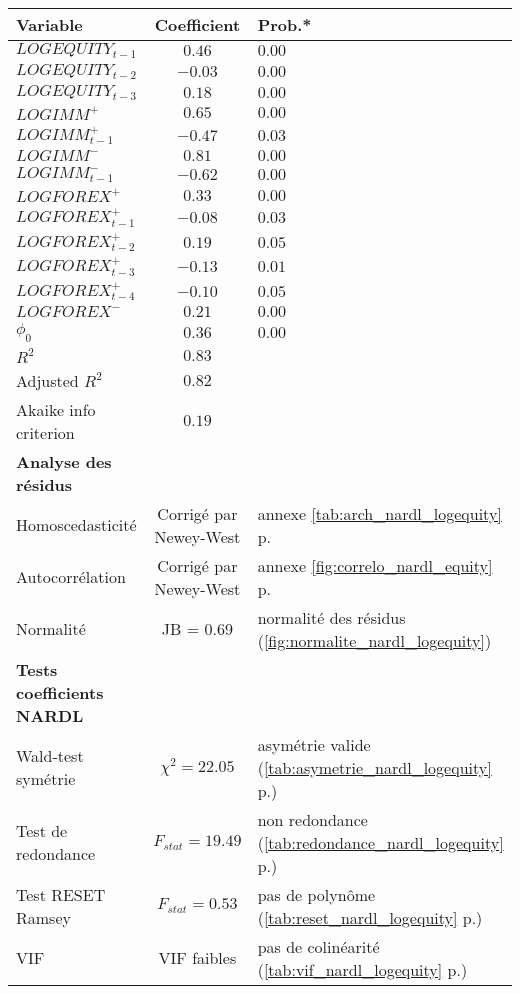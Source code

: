 \begin{tabular}{lcl}
\toprule
\textbf{Variable} & \textbf{Coefficient} & \textbf{Prob.*} \\ %
\midrule
$LOGEQUITY_{t-1}$ & $0.46$ & $0.00$ \\
$LOGEQUITY_{t-2}$ & $-0.03$ & $0.00$ \\
$LOGEQUITY_{t-3}$ & $0.18$ & $0.00$ \\
$LOGIMM^+$ & $0.65$ & $0.00$ \\
$LOGIMM^+_{t-1}$ & $-0.47$ & $0.03$ \\
$LOGIMM^-$ & $0.81$ & $0.00$ \\
$LOGIMM^-_{t-1}$ & $-0.62$ & $0.00$ \\
$LOGFOREX^+$ & $0.33$ & $0.00$ \\
$LOGFOREX^+_{t-1}$ & $-0.08$ & $0.03$ \\
$LOGFOREX^+_{t-2}$ & $0.19$ & $0.05$ \\
$LOGFOREX^+_{t-3}$ & $-0.13$ & $0.01$ \\
$LOGFOREX^+_{t-4}$ & $-0.10$ & $0.05$ \\
$LOGFOREX^-$ & $0.21$ & $0.00$ \\
$\phi_0$ & $0.36$ & $0.00$ \\
\midrule %
\textbf{$R^2$} & $0.83$ & \\
Adjusted $R^2$ & $0.82$ & \\
Akaike info criterion & $0.19$ & \\
\midrule %
\textbf{Analyse des résidus} \\ %
Homoscedasticité & Corrigé par Newey-West & annexe \ref{tab:arch_nardl_logequity} p.\pageref{tab:arch_nardl_logequity} \\
Autocorrélation & Corrigé par Newey-West & annexe \ref{fig:correlo_nardl_equity} p.\pageref{fig:correlo_nardl_equity} \\
Normalité & JB = 0.69 & normalité des résidus \footnotesize{(\ref{fig:normalite_nardl_logequity}}) \\
\midrule %
\textbf{Tests coefficients NARDL} \\ %
Wald-test symétrie & $\chi^2 = 22.05$ & asymétrie valide \footnotesize{(\ref{tab:asymetrie_nardl_logequity} p.\pageref{tab:asymetrie_nardl_logequity})}  \\
Test de redondance & $F_{stat} = 19.49$ & non redondance \footnotesize{(\ref{tab:redondance_nardl_logequity} p.\pageref{tab:redondance_nardl_logequity})}\\
Test RESET Ramsey & $F_{stat} = 0.53$ & pas de polynôme \footnotesize{(\ref{tab:reset_nardl_logequity} p.\pageref{tab:reset_nardl_logequity})} \\
VIF & VIF faibles & pas de colinéarité \footnotesize{(\ref{tab:vif_nardl_logequity} p.\pageref{tab:vif_nardl_logequity})} \\
\bottomrule
\end{tabular}
